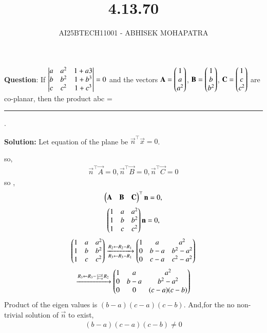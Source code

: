 \documentclass[journal,12pt,onecolumn]{IEEEtran}
\begin{document}
\title{4.13.70}
\author{AI25BTECH11001 - ABHISEK MOHAPATRA}
{\let\newpage\relax\maketitle}
	 	\textbf{Question}:
If $\begin{vmatrix}a &a^2 &1+ a3\\ b & b^2 & 1 + b^3\\c & c^2 & 1 + c^3\end{vmatrix} = 0$
and the vectors $\mathbf{A}=\begin{pmatrix}1\\a\\a^2\end{pmatrix}$, $\mathbf{B}=\begin{pmatrix}1\\b\\b^2\end{pmatrix}$, $\mathbf{C}=\begin{pmatrix}1\\c\\c^2\end{pmatrix}$ are co-planar, then the product
abc = \rule{1cm}{0.15mm}.
		

		\textbf{Solution:} 
Let equation of the plane be $\vec{n}^\top\vec{x}=0$.

so, 
\begin{align}
\vec{n}^\top\vec{A}=0,
\vec{n}^\top\vec{B}=0,
\vec{n}^\top\vec{C}=0
\end{align}
so ,
\begin{align}
		\begin{pmatrix}\mathbf{A}&\mathbf{B}&\mathbf{C}\end{pmatrix}^\top\mathbf{n}=0,
\end{align}
\begin{align}
		\begin{pmatrix}1 & a &a^2\\1&b&b^2\\1&c&c^2\end{pmatrix}\mathbf{n}=0,
\end{align}
\begin{align}
		\begin{pmatrix}1&a &a^2 \\1& b & b^2 \\1& c & c^2\end{pmatrix}	\xrightarrow[R_3\leftarrow R_3-R_1]{R_2\leftarrow R_2-R_1}\begin{pmatrix}1&a &a^2 \\0& b-a & b^2-a^2 \\0& c-a & c^2-a^2\end{pmatrix}
\end{align}
\begin{align}
		\xrightarrow[]{R_3\leftarrow R_3-\frac{c-a}{b-a}R_2}\begin{pmatrix}1&a &a^2 \\0& b-a & b^2-a^2 \\0&0 & (c-a)(c-b)\end{pmatrix}
\end{align}
Product of the eigen values is $(b-a)(c-a)(c-b)$. And,for the no non-trivial solution of $\vec{n}$ to exist, 
\begin{align}
(b-a)(c-a)(c-b) \neq 0 
\end{align}
\end{document}
